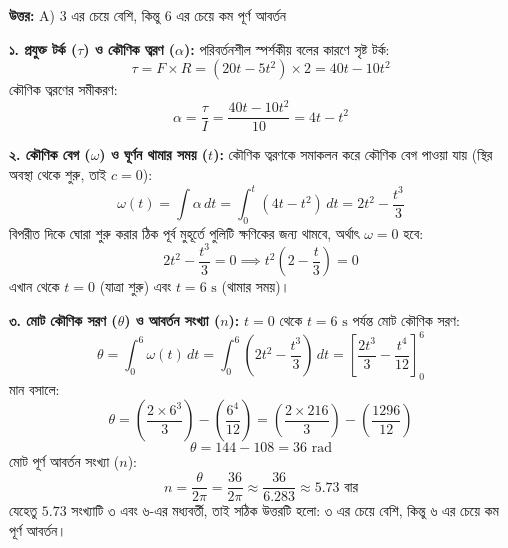 \documentclass[12pt, a4paper]{article}
\begin{document}
\vspace{0.5em}
\begin{tcolorbox}[answerbox]
\textbf{\color{success} উত্তর:} A) $3$ এর চেয়ে বেশি, কিন্তু $6$ এর চেয়ে কম পূর্ণ আবর্তন
\end{tcolorbox}
\vspace{1em}

\begin{tcolorbox}[solutionbox={সমাধান (Solution)}]
\noindent
\textbf{১. প্রযুক্ত টর্ক ($\tau$) ও কৌণিক ত্বরণ ($\alpha$):}
পরিবর্তনশীল স্পর্শকীয় বলের কারণে সৃষ্ট টর্ক:
$$\tau = F \times R = (20t - 5t^2) \times 2 = 40t - 10t^2$$
কৌণিক ত্বরণের সমীকরণ:
$$\alpha = \frac{\tau}{I} = \frac{40t - 10t^2}{10} = 4t - t^2$$

\vspace{0.5em}
\textbf{২. কৌণিক বেগ ($\omega$) ও ঘূর্ণন থামার সময় ($t$):}
কৌণিক ত্বরণকে সমাকলন করে কৌণিক বেগ পাওয়া যায় (স্থির অবস্থা থেকে শুরু, তাই $c=0$):
$$\omega(t) = \int \alpha \, dt = \int_0^t (4t - t^2) \, dt = 2t^2 - \frac{t^3}{3}$$
বিপরীত দিকে ঘোরা শুরু করার ঠিক পূর্ব মুহূর্তে পুলিটি ক্ষণিকের জন্য থামবে, অর্থাৎ $\omega = 0$ হবে:
$$2t^2 - \frac{t^3}{3} = 0 \implies t^2 \left(2 - \frac{t}{3}\right) = 0$$
এখান থেকে $t = 0$ (যাত্রা শুরু) এবং $t = 6\text{ s}$ (থামার সময়)।

\vspace{0.5em}
\textbf{৩. মোট কৌণিক সরণ ($\theta$) ও আবর্তন সংখ্যা ($n$):}
$t = 0$ থেকে $t = 6\text{ s}$ পর্যন্ত মোট কৌণিক সরণ:
$$\theta = \int_0^6 \omega(t) \, dt = \int_0^6 \left(2t^2 - \frac{t^3}{3}\right) \, dt = \left[ \frac{2t^3}{3} - \frac{t^4}{12} \right]_0^6$$
মান বসালে:
$$\theta = \left( \frac{2 \times 6^3}{3} \right) - \left( \frac{6^4}{12} \right) = \left(\frac{2 \times 216}{3}\right) - \left(\frac{1296}{12}\right)$$
$$\theta = 144 - 108 = 36\text{ rad}$$
মোট পূর্ণ আবর্তন সংখ্যা ($n$):
$$n = \frac{\theta}{2\pi} = \frac{36}{2\pi} \approx \frac{36}{6.283} \approx 5.73 \text{ বার}$$
যেহেতু $5.73$ সংখ্যাটি ৩ এবং ৬-এর মধ্যবর্তী, তাই সঠিক উত্তরটি হলো: ৩ এর চেয়ে বেশি, কিন্তু ৬ এর চেয়ে কম পূর্ণ আবর্তন।
\end{tcolorbox}
\vspace{1em}
\end{document}
